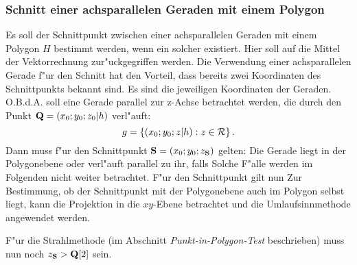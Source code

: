 \subsubsection{Schnitt einer achsparallelen Geraden mit einem Polygon}
Es soll der Schnittpunkt zwischen einer achsparallelen Geraden mit einem 
Polygon $H$ bestimmt werden, wenn ein solcher existiert. 
Hier soll auf die Mittel der Vektorrechnung zur"uckgegriffen werden. 
Die Verwendung einer achsparallelen Gerade f"ur den Schnitt hat den Vorteil, 
dass bereits zwei Koordinaten des Schnittpunkts bekannt sind.  
Es sind die jeweiligen Koordinaten der Geraden. O.B.d.A. soll eine Gerade
parallel zur z-Achse betrachtet werden, die durch den Punkt 
${\bf Q} = (x_0; y_0; z_0 | h)$ verl"auft: 
\[g = \left\{ (x_0; y_0; z | h) : z \in \mathbf{\mathcal{R}} \right\}\mbox{.}\]
Dann muss f"ur den Schnittpunkt ${\bf S}=\left(x_0; y_0; z_{\bf S}\right)$ 
gelten:
Die Gerade liegt in der Polygonebene oder verl"auft parallel zu ihr, falls 
Solche F"alle werden im Folgenden nicht weiter betrachtet.
F"ur den Schnittpunkt gilt nun 
Zur Bestimmung, ob der Schnittpunkt mit der Polygonebene auch im Polygon 
selbst liegt, kann die Projektion in die $xy$-Ebene betrachtet und die 
Umlaufsinnmethode angewendet werden. 
 
F"ur die Strahlmethode (im Abschnitt \emph{Punkt-in-Polygon-Test} 
 beschrieben) muss 
nun noch $z_{\bf S} > {\bf Q}[2]$ sein.

